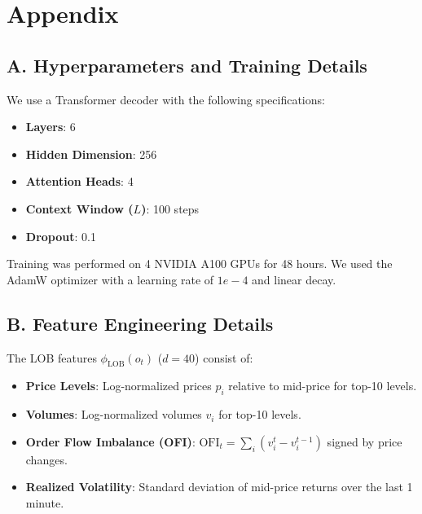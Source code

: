 \documentclass{article}
\begin{document}



\clearpage
\appendix
\section{Appendix}

\subsection{A. Hyperparameters and Training Details}
We use a Transformer decoder with the following specifications:
\begin{itemize}
    \item \textbf{Layers}: 6
    \item \textbf{Hidden Dimension}: 256
    \item \textbf{Attention Heads}: 4
    \item \textbf{Context Window ($L$)}: 100 steps
    \item \textbf{Dropout}: 0.1
\end{itemize}
Training was performed on 4 NVIDIA A100 GPUs for 48 hours. We used the AdamW optimizer with a learning rate of $1e-4$ and linear decay.

\subsection{B. Feature Engineering Details}
The LOB features $\phi_{\text{LOB}}(o_t)$ ($d=40$) consist of:
\begin{itemize}
    \item \textbf{Price Levels}: Log-normalized prices $p_i$ relative to mid-price for top-10 levels.
    \item \textbf{Volumes}: Log-normalized volumes $v_i$ for top-10 levels.
    \item \textbf{Order Flow Imbalance (OFI)}: $\text{OFI}_t = \sum_i (v_i^t - v_i^{t-1})$ signed by price changes.
    \item \textbf{Realized Volatility}: Standard deviation of mid-price returns over the last 1 minute.
\end{itemize}
\end{document}
